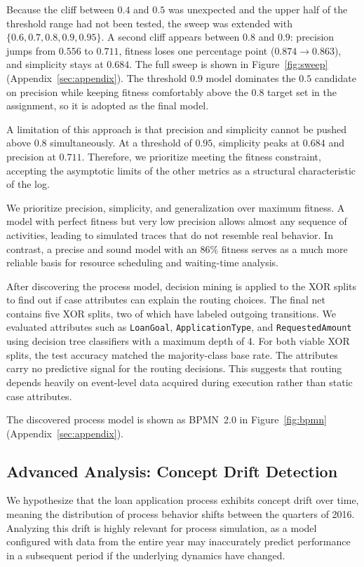 \documentclass[
  english,        %
  font=times,     %
  twocolumn,      %
]{tumarticle}
\begin{document}
Because the cliff between $0.4$ and $0.5$ was unexpected and the upper half of the threshold range had not been tested, the sweep was extended with $\{0.6, 0.7, 0.8, 0.9, 0.95\}$. A second cliff appears between $0.8$ and $0.9$: precision jumps from $0.556$ to $\mathbf{0.711}$, fitness loses one percentage point ($0.874 \to 0.863$), and simplicity stays at $0.684$. The full sweep is shown in Figure~\ref{fig:sweep} (Appendix~\ref{sec:appendix}). The threshold $0.9$ model dominates the $0.5$ candidate on precision while keeping fitness comfortably above the $0.8$ target set in the assignment, so it is adopted as the final model.

A limitation of this approach is that precision and simplicity cannot be pushed above $0.8$ simultaneously. At a threshold of $0.95$, simplicity peaks at $0.684$ and precision at $0.711$. Therefore, we prioritize meeting the fitness constraint, accepting the asymptotic limits of the other metrics as a structural characteristic of the log.

We prioritize precision, simplicity, and generalization over maximum fitness. A model with perfect fitness but very low precision allows almost any sequence of activities, leading to simulated traces that do not resemble real behavior. In contrast, a precise and sound model with an $86\%$ fitness serves as a much more reliable basis for resource scheduling and waiting-time analysis.

After discovering the process model, decision mining is applied to the XOR splits to find out if case attributes can explain the routing choices. The final net contains five XOR splits, two of which have labeled outgoing transitions. We evaluated attributes such as \texttt{LoanGoal}, \texttt{ApplicationType}, and \texttt{RequestedAmount} using decision tree classifiers with a maximum depth of 4. For both viable XOR splits, the test accuracy matched the majority-class base rate. The attributes carry no predictive signal for the routing decisions. This suggests that routing depends heavily on event-level data acquired during execution rather than static case attributes.

The discovered process model is shown as BPMN~2.0 in Figure~\ref{fig:bpmn} (Appendix~\ref{sec:appendix}).

\subsection{Advanced Analysis: Concept Drift Detection}\label{sec:advanced}
We hypothesize that the loan application process exhibits concept drift over time, meaning the distribution of process behavior shifts between the quarters of 2016. Analyzing this drift is highly relevant for process simulation, as a model configured with data from the entire year may inaccurately predict performance in a subsequent period if the underlying dynamics have changed.
\end{document}
